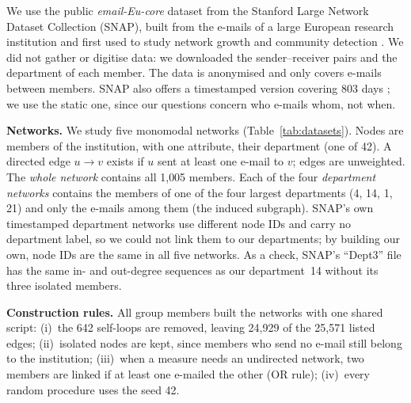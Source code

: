 

We use the public \emph{email-Eu-core} dataset from the Stanford Large
Network Dataset Collection (SNAP), built from the e-mails of a large European
research institution and first used to study network growth
\cite{leskovec2007} and community detection \cite{yin2017}. We did not
gather or digitise data: we downloaded the sender--receiver pairs and the
department of each member. The data is
anonymised and only covers e-mails between members. SNAP also offers a
timestamped version covering 803 days \cite{paranjape2017}; we use the static
one, since our questions concern who e-mails whom, not when.

\textbf{Networks.} We study five monomodal networks
(Table~\ref{tab:datasets}). Nodes are members of the institution, with one
attribute, their department (one of 42). A directed edge $u \rightarrow v$
exists if $u$ sent at least one e-mail to $v$; edges are unweighted. The
\emph{whole network} contains all 1{,}005 members. Each of the four
\emph{department networks} contains the members of one of the four largest
departments (4, 14, 1, 21) and only the e-mails among them (the induced
subgraph). SNAP's own timestamped department networks use different node IDs
and carry no department label, so we could not link them to our departments;
by building our own, node IDs are the same in all five networks. As a check,
SNAP's ``Dept3'' file has the same in- and out-degree sequences as our
department~14 without its three isolated members.

\textbf{Construction rules.} All group members built the networks with one
shared script: (i)~the 642 self-loops are removed, leaving 24{,}929 of the
25{,}571 listed edges; (ii)~isolated nodes are kept, since members who send
no e-mail still belong to the institution; (iii)~when a measure needs an
undirected network, two members are linked if at least one e-mailed the other
(OR rule); (iv)~every random procedure uses the seed 42.

